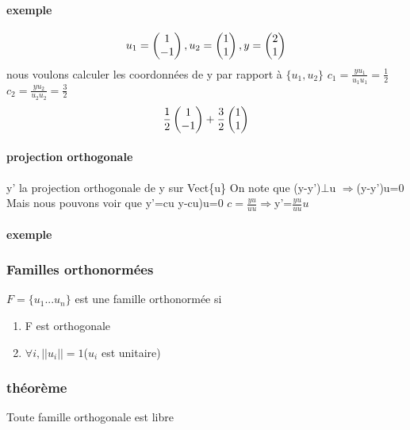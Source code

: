 \documentclass[a4paper,10pt]{article}
\begin{document}
\paragraph{exemple}
\[
u_1=
\begin{pmatrix}
 1\cr
 -1\cr
\end{pmatrix}, u_2=
\begin{pmatrix}
 1\cr
 1\cr
\end{pmatrix}, y=
\begin{pmatrix}
 2\cr
 1\cr
\end{pmatrix}
\]
\newline
nous voulons calculer les coordonnées de y par rapport à $\{u_1,u_2\}$
\newline
$c_1=\frac{yu_1}{u_1u_1}=\frac{1}{2}$
\newline
$c_2=\frac{yu_2}{u_2u_2}=\frac{3}{2}$
\newline
\[
\frac{1}{2}
\begin{pmatrix}
 1\cr
 -1\cr
\end{pmatrix}
+\frac{3}{2}
\begin{pmatrix}
 1\cr
 1\cr
\end{pmatrix}
\]
\paragraph{projection orthogonale}
y' la projection orthogonale de y sur Vect\{u\}
\newline
On note que (y-y')$\bot$u
\newline
$\Rightarrow$(y-y')u=0
\newline
Mais nous pouvons voir que y'=cu
\newline
y-cu)u=0
\newline
$c=\frac{yu}{uu}\Rightarrow$y'=$\frac{yu}{uu}u$
\paragraph{exemple}
\subsubsection{Familles orthonormées}
$F=\{u_1...u_n\}$ est une famille orthonormée si 
\begin{enumerate}
 \item F est orthogonale
 \item $\forall i,||u_i||=1$($u_i$ est unitaire)
\end{enumerate}
\subsubsection{théorème}
Toute famille orthogonale est libre
\end{document}
